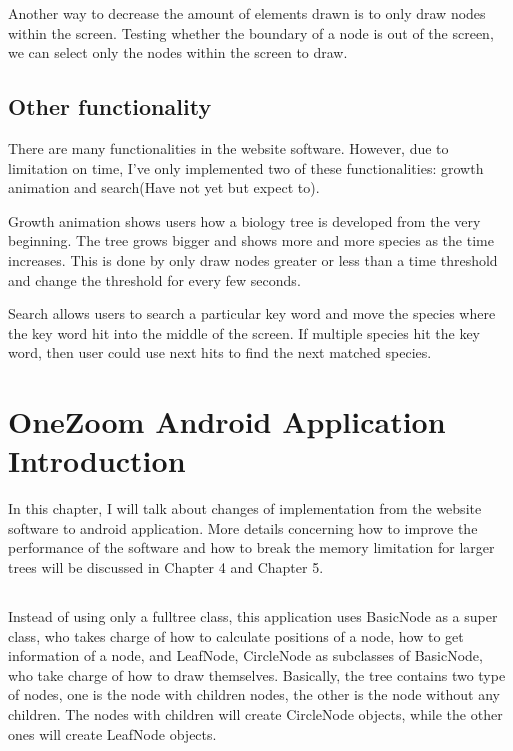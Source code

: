 \documentclass[MSc]{icldt}
\begin{document}
Another way to decrease the amount of elements drawn is to only draw nodes within the screen. Testing  whether the boundary of a node is out of the screen, we can select only the nodes within the screen to draw.

\section{Other functionality}

There are many functionalities in the website software. However, due to limitation on time, I've only implemented two of these functionalities: growth animation and search(Have not yet but expect to). 

Growth animation shows users how a biology tree is developed from the very beginning. The tree grows bigger and shows more and more species as the time increases. This is done by only draw nodes greater or less than a time threshold and change the threshold for every few seconds. 

Search allows users to search a particular key word and move the species where the key word hit into the middle of the screen. If multiple species hit the key word, then user could use next hits to find the next matched species. 

\chapter{OneZoom Android Application Introduction}

In this chapter, I will talk about changes of implementation from the website software to android application. More details concerning how to improve the performance of the software and how to break the memory limitation for larger trees will be discussed in Chapter 4 and Chapter 5.

\section{ }

Instead of using only a fulltree class, this application uses BasicNode as a super class, who takes charge of how to calculate positions of a node, how to get information of a node, and LeafNode, CircleNode as subclasses of BasicNode, who take charge of how to draw themselves. Basically, the tree contains two type of nodes, one is the node with children nodes, the other is the node without any children. The nodes with children will create CircleNode objects, while the other ones will create LeafNode objects. 
\end{document}
